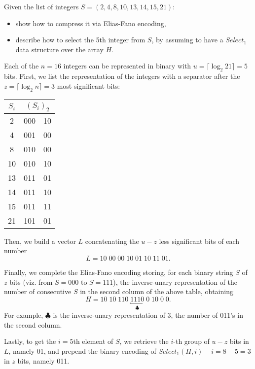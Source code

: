 \exercise

Given the list of integers $S=(2,4,8,10,13,14,15,21)$:
%
\begin{itemize}
  \item show how to compress it via Elias-Fano encoding,
  \item describe how to select the 5th integer from $S$, by assuming to have a $Select_1$ data structure over the array $H$.
\end{itemize}

\solution

Each of the $n=16$ integers can be represented in binary with $u=\lceil\log_2
21\rceil=5$ bits. First, we list the representation of the integers with a
separator after the $z=\lceil\log_2n\rceil=3$ most significant bits:
%
\begin{center}
  \begin{tabular}{ c | r | l }
    $S_i$ & \multicolumn{2}{c}{$(S_i)_2$} \\ \hline
     2 & 000 & 10 \\
     4 & 001 & 00 \\
     8 & 010 & 00 \\
    10 & 010 & 10 \\
    13 & 011 & 01 \\
    14 & 011 & 10 \\
    15 & 011 & 11 \\
    21 & 101 & 01
  \end{tabular}
\end{center}
%
Then, we build a vector  $L$ concatenating the $u-z$ less significant bits of
each number
%
$$L = 10\; 00\; 00\; 10\; 01\; 10\; 11\; 01.$$

Finally, we complete the Elias-Fano encoding storing, for each binary string $S$
of $z$ bits (viz. from $S=000$ to $S=111$), the inverse-unary representation of
the number of consecutive $S$ in the second column of the above table, obtaining
%
$$H=10\;10\;110\;\underbracket{1110}_{\clubsuit}\;0\;10\;0\;0.$$
%
For example, $\clubsuit$ is the inverse-unary representation of 3, the number of
011's in the second column.

Lastly, to get the $i=5$th element of $S$, we retrieve the $i$-th group of $u-z$
bits in $L$, namely 01, and prepend the binary encoding of $Select_1(H,
i)-i=8-5=3$ in $z$ bits, namely 011.
